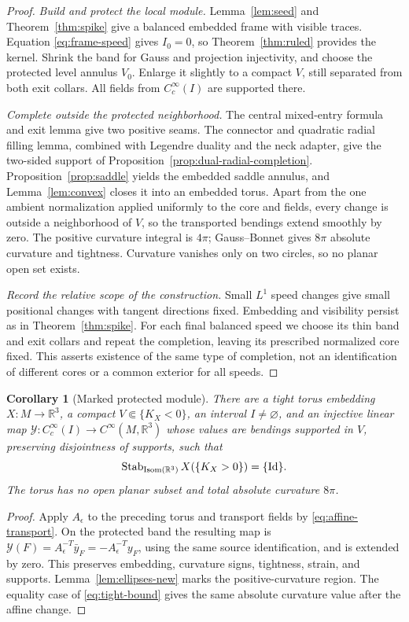 \documentclass[11pt]{amsart}
\newtheorem{corollary}[theorem]{Corollary}
\theoremstyle{definition}
\theoremstyle{remark}
\newcommand{\R}{\mathbb R}\newcommand{\Sph}{\mathbb S}
\DeclareMathOperator{\Isom}{Isom}\DeclareMathOperator{\Emb}{Emb}
\numberwithin{equation}{section}
\begin{document}
\begin{proof}
\emph{Build and protect the local module.}
Lemma~\ref{lem:seed} and Theorem~\ref{thm:spike} give a balanced embedded
frame with visible traces. Equation \eqref{eq:frame-speed} gives $I_0=0$,
so Theorem~\ref{thm:ruled} provides the kernel. Shrink the band for Gauss
and projection injectivity, and choose the protected level annulus $V_0$.
Enlarge it slightly to a compact $V$, still separated from both exit
collars. All fields from $C_c^\infty(I)$ are supported there.

\emph{Complete outside the protected neighborhood.}
The central mixed-entry formula and exit lemma give two positive seams.
The connector and quadratic radial filling lemma, combined with
Legendre duality and the neck adapter, give the two-sided support
of Proposition~\ref{prop:dual-radial-completion}.
Proposition~\ref{prop:saddle} yields the embedded saddle annulus, and
Lemma~\ref{lem:convex} closes it into an embedded torus. Apart from the
one ambient normalization applied uniformly to the core and fields,
every change is outside a neighborhood of $V$, so the transported
bendings extend smoothly by zero.
The positive curvature integral is $4\pi$; Gauss--Bonnet gives $8\pi$
absolute curvature and tightness. Curvature vanishes only on two circles,
so no planar open set exists.

\emph{Record the relative scope of the construction.}
Small $L^1$ speed changes give small positional changes with tangent
directions fixed. Embedding and visibility persist as in
Theorem~\ref{thm:spike}. For each final balanced speed we choose its thin
band and exit collars and repeat the completion, leaving its prescribed
normalized core fixed. This asserts existence of the same type of completion, not
an identification of different cores or a common exterior for all speeds.
\end{proof}

\begin{corollary}[Marked protected module]\label{cor:marked-module}
There are a tight torus embedding $X:M\to\R^3$, a compact
$V\Subset\{K_X<0\}$, an interval $I\ne\varnothing$, and an injective
linear map $\mathcal Y:C_c^\infty(I)\to C^\infty(M,\R^3)$ whose values
are bendings supported in $V$, preserving disjointness of supports, such
that
\[
 \Stab_{\Isom(\R^3)}X(\{K_X>0\})=\{\Id\}.
\]
The torus has no open planar subset and total absolute curvature $8\pi$.
\end{corollary}
\begin{proof}
Apply $A_\epsilon$ to the preceding torus and transport fields by
\eqref{eq:affine-transport}. On the protected band the resulting map is
$\mathcal Y(F)=A_\epsilon^{-T}\bar y_F=-A_\epsilon^{-T}y_F$,
using the same source identification, and is extended by zero.
This preserves embedding, curvature signs,
tightness, strain, and supports. Lemma~\ref{lem:ellipses-new} marks the
positive-curvature region. The equality case of \eqref{eq:tight-bound}
gives the same absolute curvature value after the affine change.
\end{proof}
\end{document}
